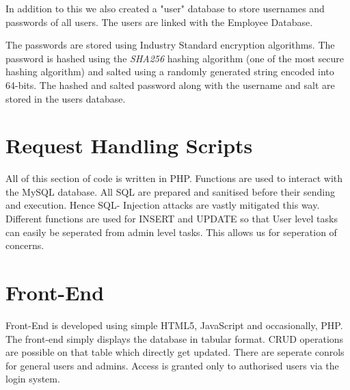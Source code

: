 \documentclass[14pt, a4paper]{extarticle}
\begin{document}
        In addition to this we also created a "user" database to store usernames and
        passwords of all users. The users are linked with the Employee Database.

        The passwords are stored using Industry Standard encryption algorithms.
        The password is hashed using the \emph{SHA256} hashing algorithm (one of 
        the most secure hashing algorithm) and salted using a randomly generated 
        string encoded into 64-bits. The hashed and salted password along with 
        the username and salt are stored in the users database.

    \section{Request Handling Scripts}
        All of this section of code is written in PHP\@. Functions are used to
        interact with the MySQL database. All SQL are prepared and sanitised 
        before their sending and execution. Hence SQL- Injection attacks are 
        vastly mitigated this way. Different functions are used for INSERT and
        UPDATE so that User level tasks can easily be seperated from admin level
        tasks. This allows us for seperation of concerns.

    \section{Front-End}
        Front-End is developed using simple HTML5, JavaScript and occasionally, 
        PHP\@. The front-end simply displays the database in tabular format. CRUD
        operations are possible on that table which directly get updated.
        There are seperate conrols for general users and admins. Access is granted only
        to authorised users via the login system. 
        
\end{document}
